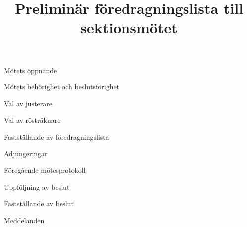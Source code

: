 \documentclass{sektionsmote}
\title{Preliminär föredragningslista till sektionsmötet}
\begin{document}
\maketitle

\begin{ootd}

\item{Mötets öppnande}

\item{Mötets behörighet och beslutsförighet}

\item{Val av justerare}

\item{Val av rösträknare}

\item{Fastställande av föredragningslista}

\item{Adjungeringar}

\item{Föregående mötesprotokoll}

\item{Uppföljning av beslut}

\item{Fastställande av beslut}

\item{Meddelanden}


\end{ootd}
\end{document}
